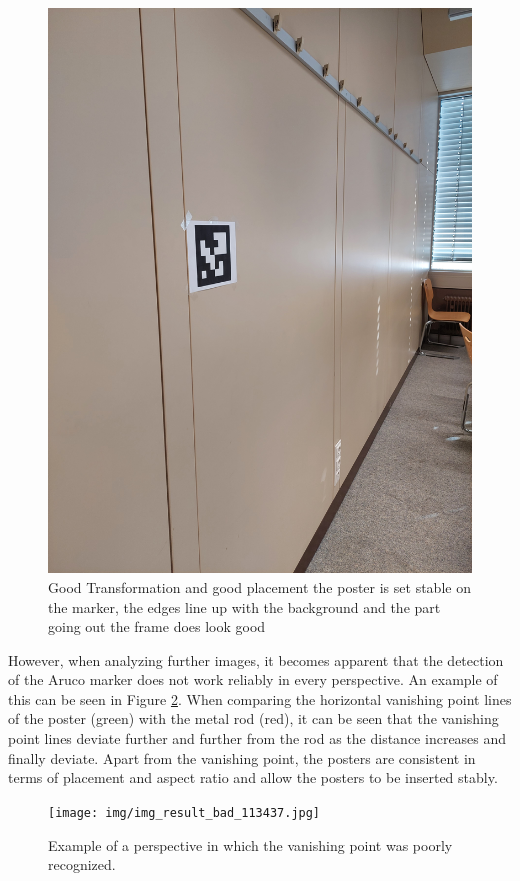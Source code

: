 \documentclass[a4paper,twocolumn]{article}
\begin{document}
    \begin{figure}[htbp]
    \centering
    \includegraphics[width=0.9\columnwidth]{img/20221115_113440.jpg} %
    \caption{Good Transformation and good placement the poster is set stable on the marker, the edges line up with the background and the part going out the frame does look good}
    \label{fig:20221115_113440.jpg}
    \end{figure}
    


However, when analyzing further images, it becomes apparent that the detection of the Aruco marker does not work reliably in every perspective. An example of this can be seen in Figure \ref{fig:bad-example-result}. When comparing the horizontal vanishing point lines of the poster (green) with the metal rod (red), it can be seen that the vanishing point lines deviate further and further from the rod as the distance increases and finally deviate.
Apart from the vanishing point, the posters are consistent in terms of placement and aspect ratio and allow the posters to be inserted stably.\begin{figure}[htbp]
    \centering
    \texttt{[image: img/img\_result\_bad\_113437.jpg]} %
    \caption{Example of a perspective in which the vanishing point was poorly recognized.}
    \label{fig:bad-example-result}
\end{figure}
\end{document}
